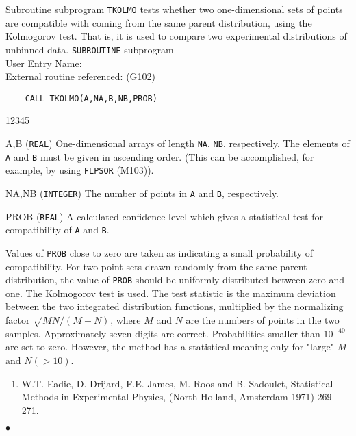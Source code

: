                                
                              
\Submitter{}                                   
Subroutine subprogram {\tt TKOLMO} tests whether two one-dimensional
sets of points are compatible with coming from the same parent
distribution, using the Kolmogorov test. That is, it is used to compare
two experimental distributions of unbinned data.
\Structure
{\tt SUBROUTINE} subprogram \\
User Entry Name:             \\
External routine referenced:  (G102)
\Usage
\begin{verbatim}
    CALL TKOLMO(A,NA,B,NB,PROB)
\end{verbatim}
\begin{DLtt}{12345}
\item[A,B] ({\tt REAL}) One-dimensional arrays of length {\tt NA},
{\tt NB}, respectively. The elements of {\tt A} and {\tt B} must
be given in ascending order. (This can be accomplished, for example,
by using {\tt FLPSOR} (M103)).
\item[NA,NB] ({\tt INTEGER}) The number of points in {\tt A} and
{\tt B}, respectively.
\item[PROB] ({\tt REAL}) A calculated confidence level which gives a
statistical test for compatibility of {\tt A} and {\tt B}.
\end{DLtt}
Values of {\tt PROB} close to zero are taken as indicating a small
probability of compatibility.  For two point sets drawn randomly
from the same parent distribution, the value of {\tt PROB} should be
uniformly distributed between zero and one.
\Method
The Kolmogorov test is used.  The test statistic is the maximum deviation
between the two integrated distribution functions, multiplied by the
normalizing factor $\sqrt{MN/(M+N)}$, where $M$ and $N$ are the
numbers of points in the two samples.
\Accuracy
Approximately seven digits are correct.
\Notes
Probabilities smaller than $10^{-40}$ are set to zero. However, the
method has a statistical meaning only for "large" $M$ and $N (>10)$.
\Refer
\begin{enumerate}
\item W.T. Eadie, D. Drijard, F.E. James, M. Roos and B. Sadoulet,
Statistical Methods in Experimental Physics, (North-Holland, Amsterdam
1971) 269-271.
\end{enumerate}
$\bullet$
